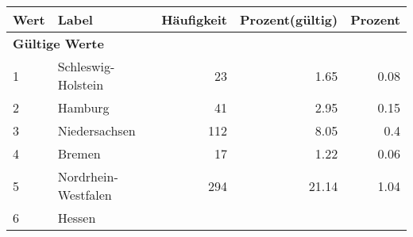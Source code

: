      \begin{longtable}{lXrrr}
     \toprule
     \textbf{Wert} & \textbf{Label} & \textbf{Häufigkeit} & \textbf{Prozent(gültig)} & \textbf{Prozent} \\
     \endhead
     \midrule
     \multicolumn{5}{l}{\textbf{Gültige Werte}}\\

     1 &
     \multicolumn{1}{X}{ Schleswig-Holstein   } &


       \num{23} &
       \num[round-mode=places,round-precision=2]{1,65} &
         \num[round-mode=places,round-precision=2]{0,08} \\

     2 &
     \multicolumn{1}{X}{ Hamburg   } &


       \num{41} &
       \num[round-mode=places,round-precision=2]{2,95} &
         \num[round-mode=places,round-precision=2]{0,15} \\

     3 &
     \multicolumn{1}{X}{ Niedersachsen   } &


       \num{112} &
       \num[round-mode=places,round-precision=2]{8,05} &
         \num[round-mode=places,round-precision=2]{0,4} \\

     4 &
     \multicolumn{1}{X}{ Bremen   } &


       \num{17} &
       \num[round-mode=places,round-precision=2]{1,22} &
         \num[round-mode=places,round-precision=2]{0,06} \\

     5 &
     \multicolumn{1}{X}{ Nordrhein-Westfalen   } &


       \num{294} &
       \num[round-mode=places,round-precision=2]{21,14} &
         \num[round-mode=places,round-precision=2]{1,04} \\

     6 &
     \multicolumn{1}{X}{ Hessen   } &



\end{longtable}
